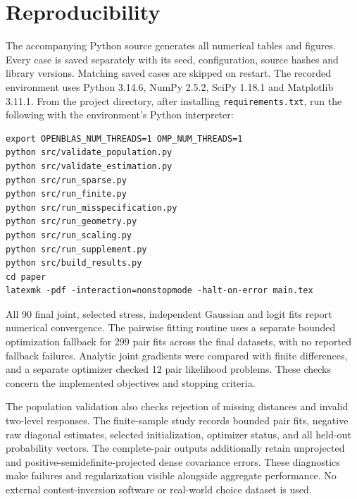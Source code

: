 \documentclass[11pt]{amsart}
\theoremstyle{definition}\newtheorem{example}[theorem]{Example}
\theoremstyle{remark}\newtheorem{remark}[theorem]{Remark}
\begin{document}
\section{Reproducibility}\label{app:reproduce}
The accompanying Python source generates all numerical tables and figures. Every case is saved separately with its seed, configuration, source hashes and library versions. Matching saved cases are skipped on restart. The recorded environment uses Python 3.14.6, NumPy 2.5.2, SciPy 1.18.1 and Matplotlib 3.11.1. From the project directory, after installing \texttt{requirements.txt}, run the following with the environment's Python interpreter:
\begin{verbatim}
export OPENBLAS_NUM_THREADS=1 OMP_NUM_THREADS=1
python src/validate_population.py
python src/validate_estimation.py
python src/run_sparse.py
python src/run_finite.py
python src/run_misspecification.py
python src/run_geometry.py
python src/run_scaling.py
python src/run_supplement.py
python src/build_results.py
cd paper
latexmk -pdf -interaction=nonstopmode -halt-on-error main.tex
\end{verbatim}
All 90 final joint, selected stress, independent Gaussian and logit fits report numerical convergence. The pairwise fitting routine uses a separate bounded optimization fallback for 299 pair fits across the final datasets, with no reported fallback failures. Analytic joint gradients were compared with finite differences, and a separate optimizer checked 12 pair likelihood problems. These checks concern the implemented objectives and stopping criteria.

The population validation also checks rejection of missing distances and invalid two-level responses. The finite-sample study records bounded pair fits, negative raw diagonal estimates, selected initialization, optimizer status, and all held-out probability vectors. The complete-pair outputs additionally retain unprojected and positive-semidefinite-projected dense covariance errors. These diagnostics make failures and regularization visible alongside aggregate performance. No external contest-inversion software or real-world choice dataset is used.




\end{document}
